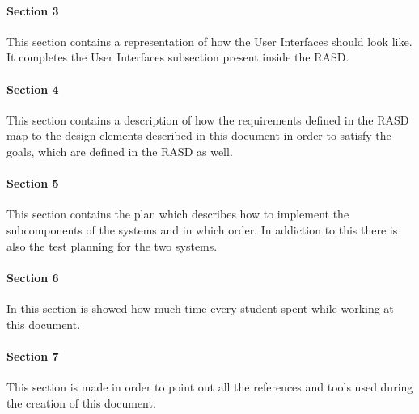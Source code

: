 \paragraph{Section 3}
This section contains a representation of how the User Interfaces should look like. It completes the User Interfaces subsection present inside the RASD.
\paragraph{Section 4}
This section contains a description of how the requirements defined in the RASD map to the design elements described in this document in order to satisfy the goals, which are defined in the RASD as well.
\paragraph{Section 5}
This section contains the plan which describes how to implement the subcomponents of the systems and in which order. In addiction to this there is also the test planning for the two systems.
\paragraph{Section 6}
In this section is showed how much time every student spent while working at this document.
\paragraph{Section 7}
This section is made in order to point out all the references and tools used during the creation of this document.